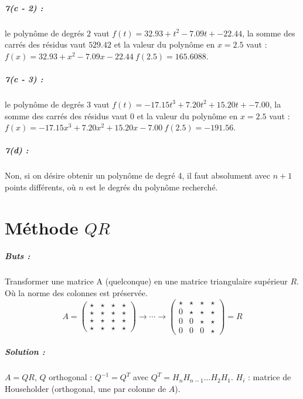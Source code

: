 \documentclass[11pt,a4paper]{report}
\begin{document}
\paragraph*{7(c - 2) : } le polynôme de degrés $2$ vaut $f(t)=32.93+t^2-7.09t+-22.44$, la somme des carrés des résidus vaut $529.42$ et la valeur du polynôme en $x=2.5$ vaut : $f(x)=32.93+x^2-7.09x-22.44 \ f(2.5)=165.6088$.

\paragraph*{7(c - 3) : } le polynôme de degrés $3$ vaut $f(t)=-17.15t^3+7.20t^2+15.20t+-7.00$, la somme des carrés des résidus vaut $0$ et la valeur du polynôme en $x=2.5$ vaut : $f(x)=-17.15x^3+7.20x^2+15.20x-7.00 \ f(2.5)=-191.56$.


\paragraph*{7(d) : } Non, si on désire obtenir un polynôme de degré 4, il faut absolument avec $n+1$ points différents, où $n$ est le degrés du polynôme recherché.

\chapter{Méthode $QR$}

\paragraph*{Buts : } Transformer une matrice A (quelconque) en une matrice triangulaire supérieur $R$. Où la norme des colonnes est préservée.
$$
A = \begin{pmatrix}
\star & \star & \star & \star \\
\star & \star & \star & \star \\
\star & \star & \star & \star \\
\star & \star & \star & \star
\end{pmatrix}
\rightarrow \cdots \rightarrow
\begin{pmatrix}
\star & \star & \star & \star \\
0 & \star & \star & \star \\
0 & 0 & \star & \star \\
0 & 0 & 0 & \star
\end{pmatrix}
= R
$$

\paragraph*{Solution : } $A=QR$, $Q$ orthogonal : $Q^{-1} = Q^T$ avec $Q^T = H_nH_{n-1}...H_2H_1$. $H_i$ : matrice de Householder (orthogonal, une par colonne de $A$).
\end{document}
